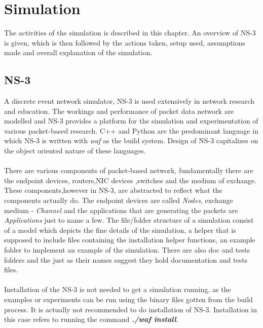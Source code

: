 \chapter{Simulation}
The activities of the simulation is described in this chapter.
An overview of NS-3 is given, which is then followed by the actions taken, setup
used, assumptions made and overall explanation of the simulation.

\section{NS-3}
A discrete event network simulator, NS-3 is used extensively in network research
and education. The workings and performance of packet data network are modelled
and NS-3 provides a platform for the simulation and experimentation of various
packet-based research. C++ and Python are the predominant language in which NS-3
is written with \textit{waf} as the build system. Design of NS-3 capitalizes on
the object oriented nature of these languages\cite{nsonline}.\\\\
There are various components of packet-based network, fundamentally there are the
endpoint devices, routers,NIC devices ,switches and the medium of exchange.
These components,however in NS-3, are abstracted to reflect what the components
actually do. The endpoint devices are called \textit{Nodes}, exchange medium
- \textit{Channel} and the applications that are generating the packets are 
\textit{Applications} just to name a few. The file/folder structure of a simulation
consist of a model which depicts the fine details of the simulation, a helper that
is supposed to include files containing the installation helper functions, an 
example folder to implement an example of the simulation. There are also doc and 
tests folders and the just as their names suggest they hold documentation and tests
files.\\\\
Installation of the NS-3 is not needed to get a simulation running, as the examples 
or experiments can be run using the binary files gotten from the build process.
It is actually not recommended to do installation of NS-3. Installation in this case
refers to running the command \textbf{\textit{./waf install}}.

